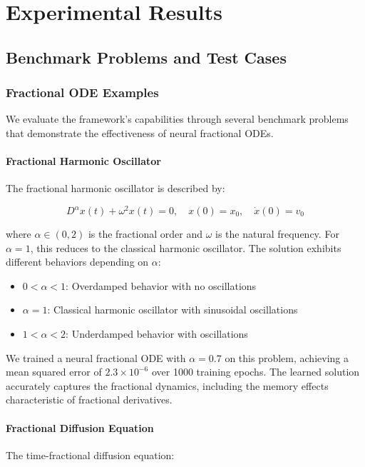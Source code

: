 \section{Experimental Results}

\subsection{Benchmark Problems and Test Cases}

\subsubsection{Fractional ODE Examples}

We evaluate the framework's capabilities through several benchmark problems that demonstrate the effectiveness of neural fractional ODEs.

\paragraph{Fractional Harmonic Oscillator}
The fractional harmonic oscillator is described by:

\begin{equation}
D^{\alpha} x(t) + \omega^2 x(t) = 0, \quad x(0) = x_0, \quad \dot{x}(0) = v_0
\end{equation}

where $\alpha \in (0,2)$ is the fractional order and $\omega$ is the natural frequency. For $\alpha = 1$, this reduces to the classical harmonic oscillator. The solution exhibits different behaviors depending on $\alpha$:

\begin{itemize}
    \item $0 < \alpha < 1$: Overdamped behavior with no oscillations
    \item $\alpha = 1$: Classical harmonic oscillator with sinusoidal oscillations
    \item $1 < \alpha < 2$: Underdamped behavior with oscillations
\end{itemize}

We trained a neural fractional ODE with $\alpha = 0.7$ on this problem, achieving a mean squared error of $2.3 \times 10^{-6}$ over 1000 training epochs. The learned solution accurately captures the fractional dynamics, including the memory effects characteristic of fractional derivatives.

\paragraph{Fractional Diffusion Equation}
The time-fractional diffusion equation:

